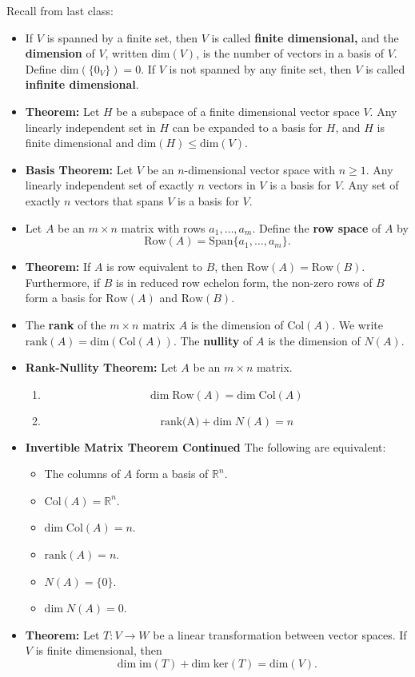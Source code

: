 \documentclass[12pt,letterpaper]{article}
\begin{document}
\thispagestyle{fancy}

Recall from last class:

\begin{itemize}
\item If $V$ is spanned by a finite set, then $V$ is called {\bf finite dimensional,} and the {\bf dimension} of $V$, written $\text{dim}(V)$, is the number of vectors in a basis of $V$. Define $\text{dim}(\{0_V\})=0$. If $V$ is not spanned by any finite set, then $V$ is called {\bf infinite dimensional}.
\item {\bf Theorem:} Let $H$ be a subspace of a finite dimensional vector space $V$. Any linearly independent set in $H$ can be expanded to a basis for $H$, and $H$ is finite dimensional and $\text{dim}(H)\leq \text{dim}(V)$.
\item {\bf Basis Theorem:} Let $V$ be an $n$-dimensional vector space with $n\geq 1$. Any linearly independent set of exactly $n$ vectors in $V$ is a basis for $V$. Any set of exactly $n$ vectors that spans $V$ is a basis for $V$.
\item Let $A$ be an $m\times n$ matrix with rows $a_1, \dots, a_m$. Define the {\bf row space} of $A$ by $$\text{Row}(A)=\text{Span}\{a_1, \dots, a_m\}.$$
\item {\bf Theorem:} If $A$ is row equivalent to $B$, then $\text{Row}(A)=\text{Row}(B)$. Furthermore, if $B$ is in reduced row echelon form, the non-zero rows of $B$ form a basis for $\text{Row}(A)$ and $\text{Row}(B)$.
\item The {\bf rank} of the $m\times n$ matrix $A$ is the dimension of $\text{Col}(A)$. We write $\text{rank}(A)=\text{dim}(\text{Col}(A))$. The {\bf nullity} of $A$ is the dimension of $N(A)$. 
\item {\bf Rank-Nullity Theorem:} Let $A$ be an $m\times n$ matrix.
\begin{enumerate}
\item $$\text{dim} \;\text{Row}(A)= \text{dim} \;\text{Col}(A)$$
\item $$\text{rank(A)}+\text{dim} \;N(A) =n$$
\end{enumerate}
\item {\bf Invertible Matrix Theorem Continued} The following are equivalent:
\begin{itemize}
\item[m.] The columns of $A$ form a basis of $\mathbb{R}^n$.
\item[n.] $\text{Col}(A)=\mathbb{R}^n$.
\item[o.] $\text{dim} \; \text{Col}(A)=n$.
\item[p.] $\text{rank}(A)=n$.
\item[q.] $N(A)=\{0\}$.
\item[r.] $\text{dim}\; N(A) =0$.
\end{itemize}
\item {\bf Theorem:} Let $T: V \to W$ be a linear transformation between vector spaces. If $V$ is finite dimensional, then $$\text{dim} \; \text{im}(T) + \text{dim} \; \text{ker}(T) =\text{dim}(V).$$
\end{itemize}
\end{document}
